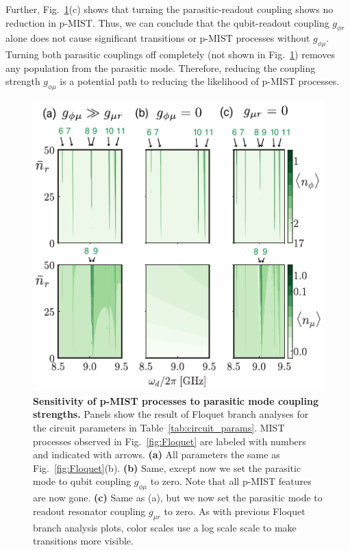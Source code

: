 \documentclass[%
reprint,
superscriptaddress,
 amsmath,amssymb,
 aps,
 prx,
longbibliography,
floatfix,
]{revtex4-2}
\newcommand{\singh}[1]{{\color{orange}{{}#1}}}%
\begin{document}
Further, Fig.~\ref{fig:coupling-Floquet}(c) shows that turning the parasitic-readout coupling \singh{to zero} shows no reduction in p-MIST. Thus, we can conclude that the qubit-readout coupling $g_{\phi r}$ alone does not cause significant transitions or p-MIST processes without $g_{\phi \mu}$. Turning both parasitic couplings off completely (not shown in Fig.~\ref{fig:coupling-Floquet}) removes any population from the parasitic mode. 
Therefore, reducing the coupling strength $g_{\phi \mu}$ is a potential path to reducing the likelihood of p-MIST processes. 
\begin{figure}[t]
    \centering
    \includegraphics[width=\linewidth]{Figures/Floquet_coupling.pdf}
    \caption{
    {\bf Sensitivity of p-MIST processes to parasitic mode coupling strengths.} Panels show the result of Floquet branch analyses for the circuit parameters in Table~\ref{tab:circuit_params}. MIST processes observed in Fig.~\ref{fig:Floquet} are labeled with numbers and indicated with arrows. \textbf{(a)} All parameters the same as Fig.~\ref{fig:Floquet}(b). \textbf{(b)} Same, except now we set the parasitic mode to qubit coupling $g_{\phi \mu}$ to zero.  Note that all p-MIST features are now gone.  \textbf{(c)} Same as (a), but we now set the parasitic mode to readout resonator coupling $g_{\mu r}$ to zero.  As with previous Floquet branch analysis plots, color scales use a log scale scale to make transitions more visible.}
    \label{fig:coupling-Floquet}
\end{figure}
\end{document}
